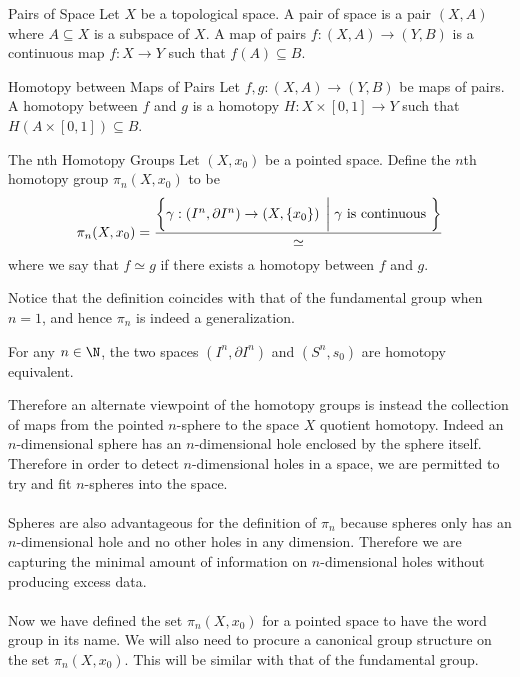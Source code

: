 \documentclass[a4paper]{article}
\begin{document}
\begin{defn}{Pairs of Space}{} Let $X$ be a topological space. A pair of space is a pair $(X,A)$ where $A\subseteq X$ is a subspace of $X$. A map of pairs $f:(X,A)\to(Y,B)$ is a continuous map $f:X\to Y$ such that $f(A)\subseteq B$. 
\end{defn}

\begin{defn}{Homotopy between Maps of Pairs}{} Let $f,g:(X,A)\to (Y,B)$ be maps of pairs. A homotopy between $f$ and $g$ is a homotopy $H:X\times[0,1]\to Y$ such that $H(A\times[0,1])\subseteq B$. 
\end{defn}

\begin{defn}{The nth Homotopy Groups}{} Let $(X,x_0)$ be a pointed space. Define the $n$th homotopy group $\pi_n(X,x_0)$ to be $$\pi_n(X,x_0)=\frac{\left\{\gamma:\left(I^n,\partial I^n\right)\to\left(X,\{x_0\}\right)\;\bigg{|}\;\gamma\text{ is continuous }\right\}}{\simeq}$$ where we say that $f\simeq g$ if there exists a homotopy between $f$ and $g$. 
\end{defn}

Notice that the definition coincides with that of the fundamental group when $n=1$, and hence $\pi_n$ is indeed a generalization. 

\begin{lmm}{}{} For any $n\in\N$, the two spaces $(I^n,\partial I^n)$ and $(S^n,s_0)$ are homotopy equivalent. 
\end{lmm}

Therefore an alternate viewpoint of the homotopy groups is instead the collection of maps from the pointed $n$-sphere to the space $X$ quotient homotopy. Indeed an $n$-dimensional sphere has an $n$-dimensional hole enclosed by the sphere itself. Therefore in order to detect $n$-dimensional holes in a space, we are permitted to try and fit $n$-spheres into the space. \\~\\

Spheres are also advantageous for the definition of $\pi_n$ because spheres only has an $n$-dimensional hole and no other holes in any dimension. Therefore we are capturing the minimal amount of information on $n$-dimensional holes without producing excess data. \\~\\

Now we have defined the set $\pi_n(X,x_0)$ for a pointed space to have the word group in its name. We will also need to procure a canonical group structure on the set $\pi_n(X,x_0)$. This will be similar with that of the fundamental group. 
\end{document}
